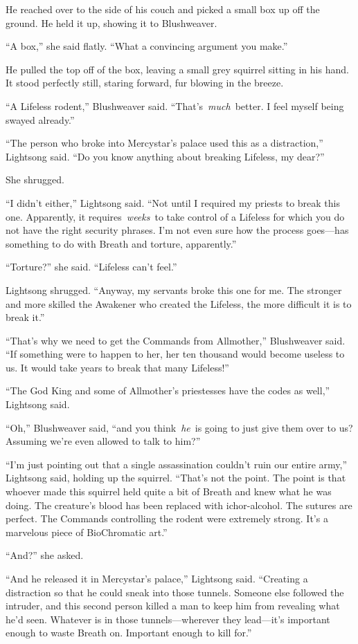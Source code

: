 He reached over to the side of his couch and picked a small box up off the ground. He held it up, showing it to Blushweaver.

“A box,” she said flatly. “What a convincing argument you make.”

He pulled the top off of the box, leaving a small grey squirrel sitting in his hand. It stood perfectly still, staring forward, fur blowing in the breeze.

“A Lifeless rodent,” Blushweaver said. “That’s~\textit{much}~better. I feel myself being swayed already.”

“The person who broke into Mercystar’s palace used this as a distraction,” Lightsong said. “Do you know anything about breaking Lifeless, my dear?”

She shrugged.

“I didn’t either,” Lightsong said. “Not until I required my priests to break this one. Apparently, it requires~\textit{weeks}~to take control of a Lifeless for which you do not have the right security phrases. I’m not even sure how the process goes—has something to do with Breath and torture, apparently.”

“Torture?” she said. “Lifeless can’t feel.”

Lightsong shrugged. “Anyway, my servants broke this one for me. The stronger and more skilled the Awakener who created the Lifeless, the more difficult it is to break it.”

“That’s why we need to get the Commands from Allmother,” Blushweaver said. “If something were to happen to her, her ten thousand would become useless to us. It would take years to break that many Lifeless!”

“The God King and some of Allmother’s priestesses have the codes as well,” Lightsong said.

“Oh,” Blushweaver said, “and you think~\textit{he}~is going to just give them over to us? Assuming we’re even allowed to talk to him?”

“I’m just pointing out that a single assassination couldn’t ruin our entire army,” Lightsong said, holding up the squirrel. “That’s not the point. The point is that whoever made this squirrel held quite a bit of Breath and knew what he was doing. The creature’s blood has been replaced with ichor-alcohol. The sutures are perfect. The Commands controlling the rodent were extremely strong. It’s a marvelous piece of BioChromatic art.”

“And?” she asked.

“And he released it in Mercystar’s palace,” Lightsong said. “Creating a distraction so that he could sneak into those tunnels. Someone else followed the intruder, and this second person killed a man to keep him from revealing what he’d seen. Whatever is in those tunnels—wherever they lead—it’s important enough to waste Breath on. Important enough to kill for.”


